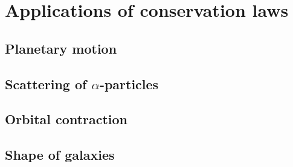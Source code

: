 \section{Applications of conservation laws}

	\subsection{Planetary motion}
	
	\subsection{Scattering of $\alpha$-particles}
	
	\subsection{Orbital contraction}
	
	\subsection{Shape of galaxies}